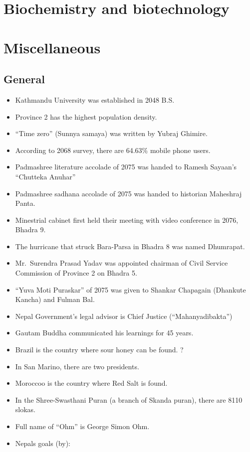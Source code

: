 \documentclass[]{book}
\begin{document}
\hypertarget{biochemistry-and-biotechnology}{%
\chapter{Biochemistry and biotechnology}\label{biochemistry-and-biotechnology}}

\hypertarget{miscellaneous}{%
\chapter{Miscellaneous}\label{miscellaneous}}

\hypertarget{general}{%
\section{General}\label{general}}

\begin{itemize}
\item
  Kathmandu University was established in 2048 B.S.
\item
  Province 2 has the highest population density.
\item
  ``Time zero'' (Sunnya samaya) was written by Yubraj Ghimire.
\item
  According to 2068 survey, there are 64.63\% mobile phone users.
\item
  Padmashree literature accolade of 2075 was handed to Ramesh Sayaan's ``Chutteka Anuhar''
\item
  Padmashree sadhana accolade of 2075 was handed to historian Maheshraj Panta.
\item
  Minestrial cabinet first held their meeting with video conference in 2076, Bhadra 9.
\item
  The hurricane that struck Bara-Parsa in Bhadra 8 was named Dhumrapat.
\item
  Mr.~Surendra Prasad Yadav was appointed chairman of Civil Service Commission of Province 2 on Bhadra 5.
\item
  ``Yuva Moti Puraskar'' of 2075 was given to Shankar Chapagain (Dhankute Kancha) and Fulman Bal.
\item
  Nepal Government's legal advisor is Chief Justice (``Mahanyadibakta'')
\item
  Gautam Buddha communicated his learnings for 45 years.
\item
  Brazil is the country where sour honey can be found. ?
\item
  In San Marino, there are two presidents.
\item
  Moroccoo is the country where Red Salt is found.
\item
  In the Shree-Swasthani Puran (a branch of Skanda puran), there are 8110 slokas.
\item
  Full name of ``Ohm'' is George Simon Ohm.
\item
  Nepals goals (by):


\end{itemize}
\end{document}
